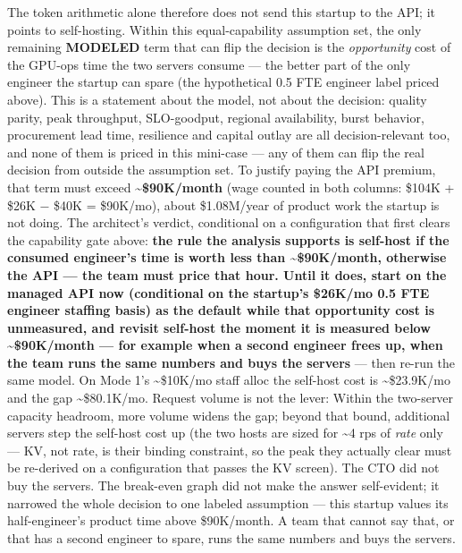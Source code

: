 The token arithmetic alone therefore does not send this startup to the
API; it points to self-hosting. Within this equal-capability assumption
set, the only remaining \textbf{MODELED} term that can flip the decision
is the \emph{opportunity} cost of the GPU-ops time the two servers
consume --- the better part of the only engineer the startup can spare
(the hypothetical 0.5 FTE engineer label priced above). This is a
statement about the model, not about the decision: quality parity, peak
throughput, SLO-goodput, regional availability, burst behavior,
procurement lead time, resilience and capital outlay are all
decision-relevant too, and none of them is priced in this mini-case ---
any of them can flip the real decision from outside the assumption set.
To justify paying the API premium, that term must exceed
\textbf{\textasciitilde\$90K/month} (wage counted in both columns:
\$104K + \$26K − \$40K = \$90K/mo), about \$1.08M/year of product work
the startup is not doing. The architect's verdict, conditional on a
configuration that first clears the capability gate above: \textbf{the
rule the analysis supports is self-host if the consumed engineer's time
is worth less than \textasciitilde\$90K/month, otherwise the API --- the
team must price that hour. Until it does, start on the managed API now
(conditional on the startup's \$26K/mo 0.5 FTE engineer staffing basis)
as the default while that opportunity cost is unmeasured, and revisit
self-host the moment it is measured below \textasciitilde\$90K/month ---
for example when a second engineer frees up, when the team runs the same
numbers and buys the servers} --- then re-run the same model. On Mode
1's \textasciitilde\$10K/mo staff alloc the self-host cost is
\textasciitilde\$23.9K/mo and the gap \textasciitilde\$80.1K/mo. Request
volume is not the lever: Within the two-server capacity headroom, more
volume widens the gap; beyond that bound, additional servers step the
self-host cost up (the two hosts are sized for \textasciitilde4 rps of
\emph{rate} only --- KV, not rate, is their binding constraint, so the
peak they actually clear must be re-derived on a configuration that
passes the KV screen). The CTO did not buy the servers. The break-even
graph did not make the answer self-evident; it narrowed the whole
decision to one labeled assumption --- this startup values its
half-engineer's product time above \$90K/month. A team that cannot say
that, or that has a second engineer to spare, runs the same numbers and
buys the servers.

